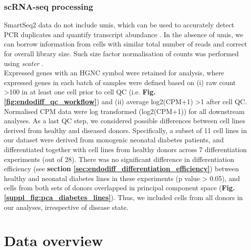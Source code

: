 \subsubsection{scRNA-seq processing}

SmartSeq2 data do not include \glspl{umi}, which can be used to accurately detect PCR duplicates and quantify transcript abundance \cite{smith2017umi, islam2014quantitative, kivioja2012counting}. 
In the absence of \glspl{umi}, we can borrow information from cells with similar total number of reads and correct for overall library size. 
Such size factor normalisation of counts was performed using \textit{scater} \cite{mccarthy2017scater}.
\\

Expressed genes with an HGNC symbol were retained for analysis, where expressed genes in each batch of samples were defined based on (i) raw count >100 in at least one cell prior to cell QC (i.e. \textbf{Fig. \ref{fig:endodiff_qc_workflow}}) and (ii) average log2(CPM+1) >1 after cell QC. 
Normalised CPM data were log transformed (log2(CPM+1)) for all downstream analyses. 
As a last QC step, we considered possible differences between cell lines derived from healthy and diseased donors. 
Specifically, a subset of 11 cell lines in our dataset were derived from monogenic neonatal diabetes patients, and differentiated together with cell lines from healthy donors across 7 differentiation experiments (out of 28). 
There was no significant difference in differentiation efficiency (see \textbf{section \ref{sec:endodiff_differentiation_efficiency}}) between healthy and neonatal diabetes lines in these experiments (p value > 0.05), and cells from both sets of donors overlapped in principal component space (\textbf{Fig. \ref{suppl_fig:pca_diabetes_lines}}). 
Thus, we included cells from all donors in our analyses, irrespective of disease state.


\newpage

\section{Data overview}
\label{sec:endodiff_overview}

